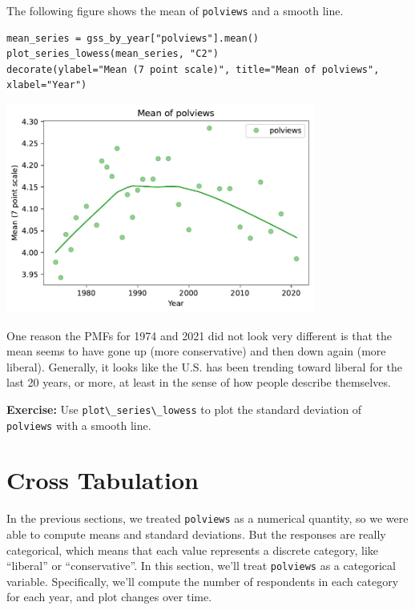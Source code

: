 The following figure shows the mean of
\passthrough{\lstinline!polviews!} and a smooth line.

\begin{lstlisting}[]
mean_series = gss_by_year["polviews"].mean()
plot_series_lowess(mean_series, "C2")
decorate(ylabel="Mean (7 point scale)", title="Mean of polviews", xlabel="Year")
\end{lstlisting}

\begin{center}
\includegraphics[width=4in]{chapters/02_polviews_files/02_polviews_59_0.pdf}
\end{center}

One reason the PMFs for 1974 and 2021 did not look very different is
that the mean seems to have gone up (more conservative) and then down
again (more liberal). Generally, it looks like the U.S. has been
trending toward liberal for the last 20 years, or more, at least in the
sense of how people describe themselves.

\textbf{Exercise:} Use \passthrough{\lstinline!plot\_series\_lowess!} to
plot the standard deviation of \passthrough{\lstinline!polviews!} with a
smooth line.

\hypertarget{cross-tabulation}{%
\section{Cross Tabulation}\label{cross-tabulation}}

In the previous sections, we treated \passthrough{\lstinline!polviews!}
as a numerical quantity, so we were able to compute means and standard
deviations. But the responses are really categorical, which means that
each value represents a discrete category, like ``liberal'' or
``conservative''. In this section, we'll treat
\passthrough{\lstinline!polviews!} as a categorical variable.
Specifically, we'll compute the number of respondents in each category
for each year, and plot changes over time.


